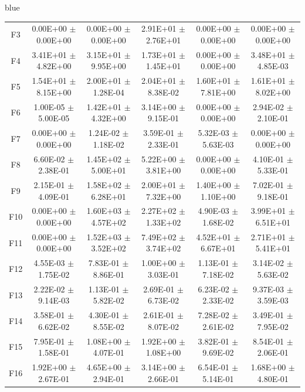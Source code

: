 \documentclass[journal, onecolumn]{IEEEtran}
\begin{document}
\begin{color}{blue}
\begin{table}[htbp!]
\begin{tabular}{c|ccccc}
			F3	 &	0.00E+00	$\pm$	0.00E+00	 &	0.00E+00	$\pm$	0.00E+00		 &	2.91E+01	$\pm$	2.76E+01		 &	0.00E+00	$\pm$	0.00E+00		 &	0.00E+00	$\pm$	0.00E+00	\\		
			F4	 &	3.41E+01	$\pm$	4.82E+00	 &	3.15E+01	$\pm$	9.95E+00		 &	1.73E+01	$\pm$	1.45E+01		 &	0.00E+00	$\pm$	0.00E+00		 &	3.48E+01	$\pm$	4.85E-03	\\		
			F5	 &	1.54E+01	$\pm$	8.15E+00	 &	2.00E+01	$\pm$	1.28E-04		 &	2.04E+01	$\pm$	8.38E-02		 &	1.60E+01	$\pm$	7.81E+00		 &	1.61E+01	$\pm$	8.02E+00	\\		
			F6	 &	1.00E-05	$\pm$	5.00E-05	 &	1.42E+01	$\pm$	4.32E+00		 &	3.14E+00	$\pm$	9.15E-01		 &	0.00E+00	$\pm$	0.00E+00		 &	2.94E-02	$\pm$	2.10E-01	\\		
			F7	 &	0.00E+00	$\pm$	0.00E+00	 &	1.24E-02	$\pm$	1.18E-02		 &	3.59E-01	$\pm$	2.33E-01		 &	5.32E-03	$\pm$	5.63E-03		 &	0.00E+00	$\pm$	0.00E+00	\\		
			F8	 &	6.60E-02	$\pm$	2.38E-01	 &	1.45E+02	$\pm$	5.00E+01		 &	5.22E+00	$\pm$	3.81E+00		 &	0.00E+00	$\pm$	0.00E+00		 &	4.10E-01	$\pm$	5.33E-01	\\		
			F9	 &	2.15E-01	$\pm$	4.09E-01	 &	1.58E+02	$\pm$	6.28E+01		 &	2.00E+01	$\pm$	7.32E+00		 &	1.40E+00	$\pm$	1.10E+00		 &	7.02E-01	$\pm$	9.18E-01	\\		
			F10	 &	0.00E+00	$\pm$	0.00E+00	 &	1.60E+03	$\pm$	4.57E+02		 &	2.27E+02	$\pm$	1.33E+02		 &	4.90E-03	$\pm$	1.68E-02		 &	3.99E+01	$\pm$	6.51E+01	\\		
			F11	 &	0.00E+00	$\pm$	0.00E+00	 &	1.52E+03	$\pm$	3.52E+02		 &	7.49E+02	$\pm$	3.74E+02		 &	4.52E+01	$\pm$	6.67E+01		 &	2.71E+01	$\pm$	5.41E+01	\\		
			F12	 &	4.55E-03	$\pm$	1.75E-02	 &	7.83E-01	$\pm$	8.86E-01		 &	1.00E+00	$\pm$	3.03E-01		 &	1.13E-01	$\pm$	7.18E-02		 &	3.14E-02	$\pm$	5.63E-02	\\		
			F13	 &	2.22E-02	$\pm$	9.14E-03	 &	1.13E-01	$\pm$	5.82E-02		 &	2.69E-01	$\pm$	6.73E-02		 &	6.23E-02	$\pm$	2.33E-02		 &	9.37E-03	$\pm$	3.59E-03	\\		
			F14	 &	3.58E-01	$\pm$	6.62E-02	 &	4.30E-01	$\pm$	8.55E-02		 &	2.61E-01	$\pm$	8.07E-02		 &	7.28E-02	$\pm$	2.61E-02		 &	3.49E-01	$\pm$	7.95E-02	\\		
			F15	 &	7.95E-01	$\pm$	1.58E-01	 &	1.08E+00	$\pm$	4.07E-01		 &	1.92E+00	$\pm$	1.08E+00		 &	3.82E-01	$\pm$	9.69E-02		 &	8.54E-01	$\pm$	2.06E-01	\\		
			F16	 &	1.92E+00	$\pm$	2.67E-01	 &	4.65E+00	$\pm$	2.94E-01		 &	3.14E+00	$\pm$	2.66E-01		 &	6.54E-01	$\pm$	5.14E-01		 &	1.68E+00	$\pm$	4.80E-01	\\		

\end{tabular}
\end{table}
\end{color}
\end{document}
